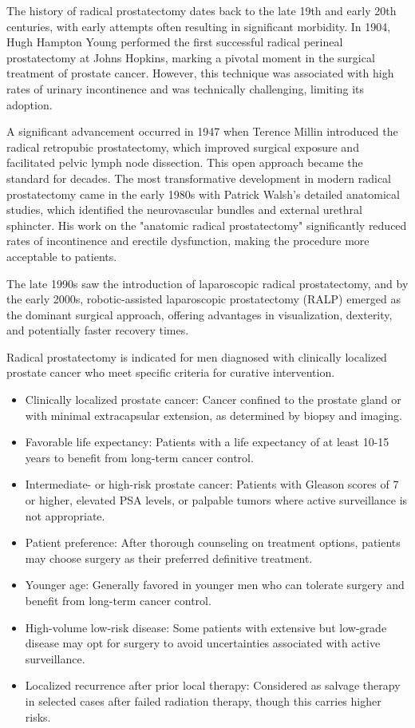 The history of radical prostatectomy dates back to the late 19th and early 20th centuries, with early attempts often resulting in significant morbidity. In 1904, Hugh Hampton Young performed the first successful radical perineal prostatectomy at Johns Hopkins, marking a pivotal moment in the surgical treatment of prostate cancer. However, this technique was associated with high rates of urinary incontinence and was technically challenging, limiting its adoption.

A significant advancement occurred in 1947 when Terence Millin introduced the radical retropubic prostatectomy, which improved surgical exposure and facilitated pelvic lymph node dissection. This open approach became the standard for decades. The most transformative development in modern radical prostatectomy came in the early 1980s with Patrick Walsh's detailed anatomical studies, which identified the neurovascular bundles and external urethral sphincter. His work on the "anatomic radical prostatectomy" significantly reduced rates of incontinence and erectile dysfunction, making the procedure more acceptable to patients.

The late 1990s saw the introduction of laparoscopic radical prostatectomy, and by the early 2000s, robotic-assisted laparoscopic prostatectomy (RALP) emerged as the dominant surgical approach, offering advantages in visualization, dexterity, and potentially faster recovery times.

Radical prostatectomy is indicated for men diagnosed with clinically localized prostate cancer who meet specific criteria for curative intervention.

\begin{itemize}
  \item Clinically localized prostate cancer: Cancer confined to the prostate gland or with minimal extracapsular extension, as determined by biopsy and imaging.
  \item Favorable life expectancy: Patients with a life expectancy of at least 10-15 years to benefit from long-term cancer control.
  \item Intermediate- or high-risk prostate cancer: Patients with Gleason scores of 7 or higher, elevated PSA levels, or palpable tumors where active surveillance is not appropriate.
  \item Patient preference: After thorough counseling on treatment options, patients may choose surgery as their preferred definitive treatment.
  \item Younger age: Generally favored in younger men who can tolerate surgery and benefit from long-term cancer control.
  \item High-volume low-risk disease: Some patients with extensive but low-grade disease may opt for surgery to avoid uncertainties associated with active surveillance.
  \item Localized recurrence after prior local therapy: Considered as salvage therapy in selected cases after failed radiation therapy, though this carries higher risks.
\end{itemize}

